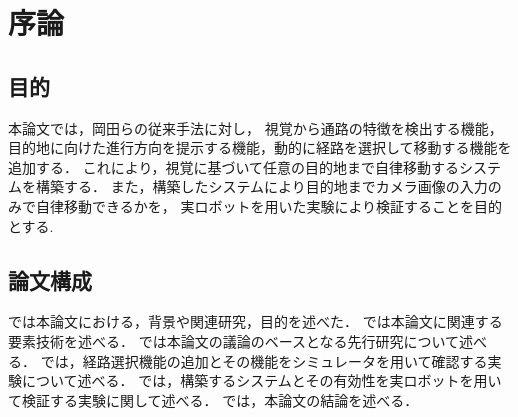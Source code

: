 \chapter{序論}
\label{chap:introduction}
%
%
%

%
% 
\newpage

\newpage
\section{目的}
本論文では，岡田らの従来手法に対し，
視覚から通路の特徴を検出する機能，目的地に向けた進行方向を提示する機能，動的に経路を選択して移動する機能を追加する．
これにより，視覚に基づいて任意の目的地まで自律移動するシステムを構築する．
また，構築したシステムにより目的地までカメラ画像の入力のみで自律移動できるかを，
実ロボットを用いた実験により検証することを目的とする.

\section{論文構成}
では本論文における，背景や関連研究，目的を述べた．
では本論文に関連する要素技術を述べる．
では本論文の議論のベースとなる先行研究について述べる．
では，経路選択機能の追加とその機能をシミュレータを用いて確認する実験について述べる．
では，構築するシステムとその有効性を実ロボットを用いて検証する実験に関して述べる．
では，本論文の結論を述べる．